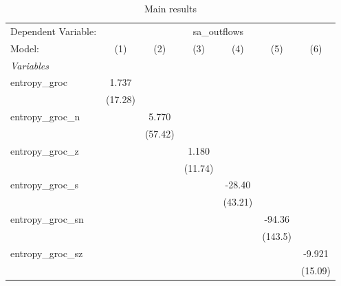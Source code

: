 
\begin{table}[htbp]
   \centering
   \footnotesize
   \begin{threeparttable}[b]
      \caption{\label{tab:reg_sa_outflows_groc.tex} Main results}
      \begin{tabular}{lcccccc}
         \tabularnewline \midrule \midrule
         Dependent Variable: & \multicolumn{6}{c}{sa\_outflows}\\
         Model:              & (1)           & (2)           & (3)           & (4)           & (5)           & (6)\\  
         \midrule
         \emph{Variables}\\
         entropy\_groc       & 1.737         &               &               &               &               &   \\   
                             & (17.28)       &               &               &               &               &   \\   
         entropy\_groc\_n    &               & 5.770         &               &               &               &   \\   
                             &               & (57.42)       &               &               &               &   \\   
         entropy\_groc\_z    &               &               & 1.180         &               &               &   \\   
                             &               &               & (11.74)       &               &               &   \\   
         entropy\_groc\_s    &               &               &               & -28.40        &               &   \\   
                             &               &               &               & (43.21)       &               &   \\   
         entropy\_groc\_sn   &               &               &               &               & -94.36        &   \\   
                             &               &               &               &               & (143.5)       &   \\   
         entropy\_groc\_sz   &               &               &               &               &               & -9.921\\   
                             &               &               &               &               &               & (15.09)\\   

\end{tabular}
\end{threeparttable}
\end{table}
